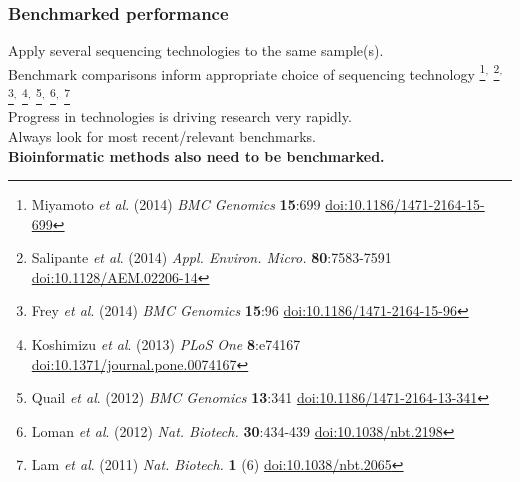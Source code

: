 \begin{frame}
  \frametitle{Benchmarked performance}
  Apply several sequencing technologies to the same sample(s). \\  
  Benchmark comparisons inform appropriate choice of sequencing technology%
\footnote{\tiny{Miyamoto \textit{et al}. (2014) \textit{BMC Genomics} \textbf{15}:699 \href{http://dx.doi.org/10.1186/1471-2164-15-699}{doi:10.1186/1471-2164-15-699}}}$^{,}$%
\footnote{\tiny{Salipante \textit{et al}. (2014) \textit{Appl. Environ. Micro.} \textbf{80}:7583-7591 \href{http://dx.doi.org/10.1128/AEM.02206-14}{doi:10.1128/AEM.02206-14}}}$^{,}$%
\footnote{\tiny{Frey \textit{et al}. (2014) \textit{BMC Genomics} \textbf{15}:96 \href{http://dx.doi.org/10.1186/1471-2164-15-96}{doi:10.1186/1471-2164-15-96}}}$^{,}$%
\footnote{\tiny{Koshimizu \textit{et al}. (2013) \textit{PLoS One} \textbf{8}:e74167 \href{http://dx.doi.org/10.1371/journal.pone.0074167}{doi:10.1371/journal.pone.0074167}}}$^{,}$%
\footnote{\tiny{Quail \textit{et al}. (2012) \textit{BMC Genomics} \textbf{13}:341 \href{http://dx.doi.org/10.1186/1471-2164-13-341}{doi:10.1186/1471-2164-13-341}}}$^{,}$%
\footnote{\tiny{Loman \textit{et al}. (2012) \textit{Nat. Biotech.} \textbf{30}:434-439 \href{http://dx.doi.org/10.1038/nbt.2198}{doi:10.1038/nbt.2198}}}$^{,}$%
\footnote{\tiny{Lam \textit{et al}. (2011) \textit{Nat. Biotech.} \textbf{1} (6) \href{http://dx.doi.org/10.1038/nbt.2065}{doi:10.1038/nbt.2065}}} \\[0.5cm]
  Progress in technologies is driving research very rapidly. \\
  Always look for most recent/relevant benchmarks. \\[0.5cm]
  \textbf{Bioinformatic methods also need to be benchmarked.}
\end{frame}

